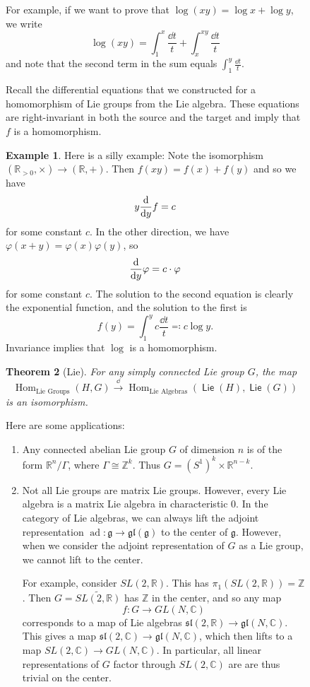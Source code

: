 \documentclass[leqno, openany]{memoir}
\newtheorem{thm}{Theorem}[section]
\theoremstyle{definition}
\newtheorem{exm}[thm]{Example}
\theoremstyle{remark}
\theoremstyle{plain}
\theoremstyle{definition}
\theoremstyle{remark}
\newcommand{\R}{\mathbb{R}}
\newcommand{\C}{\mathbb{C}}
\newcommand{\Z}{\mathbb{Z}}
\newcommand{\mf}[1]{\mathfrak{#1}}
\newcommand{\wtl}[1]{\widetilde{#1}}
\DeclareMathOperator{\Hom}{Hom}
\DeclareMathOperator{\ad}{ad}
\DeclareMathOperator{\Lie}{\mathsf{Lie}}
\begin{document}
\begin{figure}[H]
For example, if we want to prove that $\log(xy) = \log x + \log y$, we write \[
\log(xy) = \int_1^x \frac{\dd{t}}{t} + \int_x^{xy} \frac{\dd{t}}{t} \] and note
that the second term in the sum equals $\int_1^y \frac{\dd{t}}{t}$.

Recall the differential equations that we constructed for a homomorphism of Lie
groups from the Lie algebra. These equations are right-invariant in both the
source and the target and imply that $f$ is a homomorphism.

\begin{exm} Here is a silly example: Note the isomorphism $(\R_{>0}, \times)
    \to (\R, +)$. Then $f(xy) = f(x) + f(y)$ and so we have \[ y \dv{y} f = c
    \] for some constant $c$. In the other direction, we have $\varphi(x+y) =
    \varphi(x) \varphi(y)$, so \[ \dv{y} \varphi = c \cdot \varphi \] for some
    constant $c$. The solution to the second equation is clearly the
    exponential function, and the solution to the first is \[ f(y) = \int_1^y c
    \frac{\dd{t}}{t} \eqqcolon c \log y. \] Invariance implies that $\log$ is a
homomorphism.  \end{exm}

\begin{thm}[Lie] For any simply connected Lie group $G$, the map \[
\Hom_{\text{Lie Groups}}(H,G) \xrightarrow{\dd} \Hom_{\text{Lie
Algebras}}(\Lie(H), \Lie(G)) \] is an isomorphism.  \end{thm}

Here are some applications: \begin{enumerate} \item Any connected abelian Lie
    group $G$ of dimension $n$ is of the form $\R^n / \Gamma$, where $\Gamma
    \cong \Z^k$. Thus $G = (S^1)^k \times \R^{n-k}$.  \item Not all Lie groups
    are matrix Lie groups. However, every Lie algebra is a matrix Lie algebra
    in characteristic $0$. In the category of Lie algebras, we can always lift
    the adjoint representation $\ad \colon \mf{g} \to \mf{gl}(\mf{g})$ to the
    center of $\mf{g}$. However, when we consider the adjoint representation of
    $G$ as a Lie group, we cannot lift to the center.

        For example, consider $SL(2, \R)$. This has $\pi_1(SL(2, \R)) = \Z$.
        Then $G = \wtl{SL(2, \R)}$ has $\Z$ in the center, and so any map \[ f
        \colon G \to GL(N, \C) \] corresponds to a map of Lie algebras
        $\mf{sl}(2, \R) \to \mf{gl}(N, \C)$. This gives a map $\mf{sl}(2, \C)
        \to \mf{gl}(N, \C)$, which then lifts to a map $SL(2, \C) \to GL(N,
        \C)$. In particular, all linear representations of $G$ factor through
        $SL(2, \C)$ are are thus trivial on the center.  \end{enumerate}


\end{figure}
\end{document}
